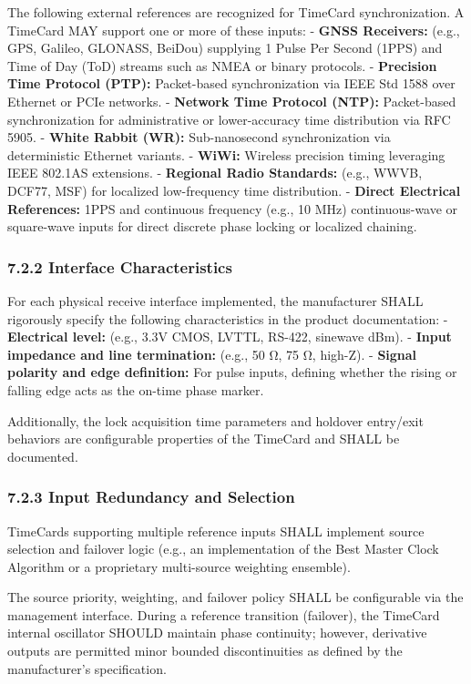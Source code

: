 \documentclass[
]{article}
\begin{document}
The following external references are recognized for TimeCard
synchronization. A TimeCard MAY support one or more of these inputs: -
\textbf{GNSS Receivers:} (e.g., GPS, Galileo, GLONASS, BeiDou) supplying
1 Pulse Per Second (1PPS) and Time of Day (ToD) streams such as NMEA or
binary protocols. - \textbf{Precision Time Protocol (PTP):} Packet-based
synchronization via IEEE Std 1588 over Ethernet or PCIe networks. -
\textbf{Network Time Protocol (NTP):} Packet-based synchronization for
administrative or lower-accuracy time distribution via RFC 5905. -
\textbf{White Rabbit (WR):} Sub-nanosecond synchronization via
deterministic Ethernet variants. - \textbf{WiWi:} Wireless precision
timing leveraging IEEE 802.1AS extensions. - \textbf{Regional Radio
Standards:} (e.g., WWVB, DCF77, MSF) for localized low-frequency time
distribution. - \textbf{Direct Electrical References:} 1PPS and
continuous frequency (e.g., 10 MHz) continuous-wave or square-wave
inputs for direct discrete phase locking or localized chaining.

\subsubsection{7.2.2 Interface
Characteristics}\label{interface-characteristics}

For each physical receive interface implemented, the manufacturer SHALL
rigorously specify the following characteristics in the product
documentation: - \textbf{Electrical level:} (e.g., 3.3V CMOS, LVTTL,
RS-422, sinewave dBm). - \textbf{Input impedance and line termination:}
(e.g., 50 Ω, 75 Ω, high-Z). - \textbf{Signal polarity and edge
definition:} For pulse inputs, defining whether the rising or falling
edge acts as the on-time phase marker.

Additionally, the lock acquisition time parameters and holdover
entry/exit behaviors are configurable properties of the TimeCard and
SHALL be documented.

\subsubsection{7.2.3 Input Redundancy and
Selection}\label{input-redundancy-and-selection}

TimeCards supporting multiple reference inputs SHALL implement source
selection and failover logic (e.g., an implementation of the Best Master
Clock Algorithm or a proprietary multi-source weighting ensemble).

The source priority, weighting, and failover policy SHALL be
configurable via the management interface. During a reference transition
(failover), the TimeCard internal oscillator SHOULD maintain phase
continuity; however, derivative outputs are permitted minor bounded
discontinuities as defined by the manufacturer's specification.
\end{document}
